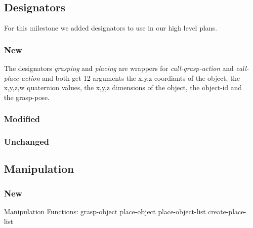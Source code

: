 \documentclass[main.tex]{subfiles}
\begin{document}
                \subsection{Designators}
                For this milestone we added designators to use in our high level plans.
                \subsubsection{New} 
                The designators \textit {grasping} and \textit {placing} are wrappers for \textit {call-grasp-action} and \textit {call-place-action} and both get 12 arguments the x,y,z coordiants of the object, the x,y,z,w quaternion values, the x,y,z dimensions of the object, the object-id and the grasp-pose. 

                \subsubsection{Modified}
                \subsubsection{Unchanged}
                
                \subsection{Manipulation}
                \subsubsection{New}
                Manipulation Functions:
                grasp-object
                place-object
                place-object-list
                create-place-list
                
                
                
\end{document}
